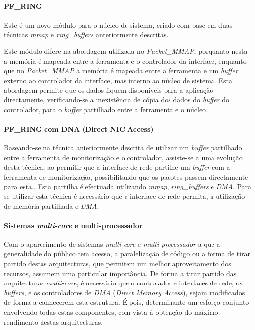 \paragraph*{PF\_RING}

Este é um novo módulo para o núcleo de sistema, criado com base em duas técnicas \textit{mmap} e \textit{ring\_buffers} anteriormente descritas.

Este módulo difere na abordagem utilizada no \textit{Packet\_MMAP}, porquanto nesta a memória é mapeada entre a ferramenta e o controlador da interface, enquanto que no \textit{Packet\_MMAP} a memória é mapeada entre a ferramenta e um \textit{buffer} externo ao controlador da interface, mas interno ao núcleo de sistema.
Esta abordagem permite que os dados fiquem disponíveis para a aplicação directamente, verificando-se a inexistência de cópia dos dados do \textit{buffer} do controlador, para o \textit{buffer} partilhado entre a ferramenta e o núcleo\cite{:PF_RING}.
 
\paragraph*{PF\_RING com DNA (Direct NIC Access)}
Baseando-se na técnica anteriormente descrita de utilizar um \textit{buffer} partilhado entre a ferramenta de monitorização e o controlador, assiste-se a uma evolução desta técnica, ao permitir que a interface de rede partilhe um \textit{buffer} com a ferramenta de monitorização, possibilitando que os pacotes passem directamente para esta.\cite{:IntroPF_RIDNADirecNICAcces}.
Esta partilha é efectuada utilizando \textit{mmap}, \textit{ring\_buffers} e \textit{DMA}.
Para se utilizar esta técnica é necessário que a interface de rede permita, a utilização de memória partilhada e \textit{DMA}.

\paragraph*{Sistemas \textit{multi-core} e multi-processador}

Com o aparecimento de sistemas \textit{multi-core} e \textit{multi-processador} a que a generalidade do público tem acesso, a paralelização de código ou a forma de tirar partido destas arquitecturas, que permitem um melhor aproveitamento dos recursos, assumem uma particular importância.
De forma a tirar partido das arquitecturas \textit{multi-core}, é necessário que o controlador e interfaces de rede, os \textit{buffers}, e os controladores de \textit{DMA} (\textit{Direct Memory Access}), sejam modificados de forma a conhecerem esta estrutura.
É pois, determinante um esforço conjunto envolvendo todas estas componentes, com vista à obtenção do máximo rendimento destas arquitecturas\cite{Deri:2010}.


